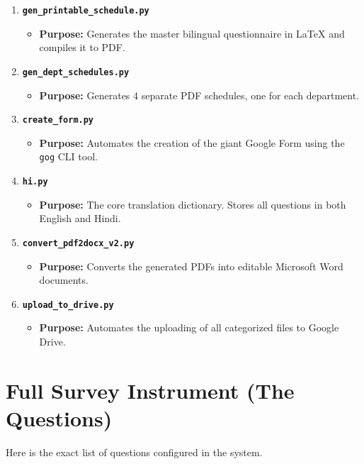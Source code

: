 \documentclass[11pt,a4paper]{article}
\begin{document}
\begin{enumerate}
    \item \textbf{\texttt{gen\_printable\_schedule.py}}
    \begin{itemize}
        \item \textbf{Purpose:} Generates the master bilingual questionnaire in LaTeX and compiles it to PDF.
    \end{itemize}
    
    \item \textbf{\texttt{gen\_dept\_schedules.py}}
    \begin{itemize}
        \item \textbf{Purpose:} Generates 4 separate PDF schedules, one for each department.
    \end{itemize}
    
    \item \textbf{\texttt{create\_form.py}}
    \begin{itemize}
        \item \textbf{Purpose:} Automates the creation of the giant Google Form using the \texttt{gog} CLI tool.
    \end{itemize}
    
    \item \textbf{\texttt{hi.py}}
    \begin{itemize}
        \item \textbf{Purpose:} The core translation dictionary. Stores all questions in both English and Hindi.
    \end{itemize}
    
    \item \textbf{\texttt{convert\_pdf2docx\_v2.py}}
    \begin{itemize}
        \item \textbf{Purpose:} Converts the generated PDFs into editable Microsoft Word documents.
    \end{itemize}
    
    \item \textbf{\texttt{upload\_to\_drive.py}}
    \begin{itemize}
        \item \textbf{Purpose:} Automates the uploading of all categorized files to Google Drive.
    \end{itemize}
\end{enumerate}

\newpage
\appendix
\section{Full Survey Instrument (The Questions)}
Here is the exact list of questions configured in the system.
\end{document}
